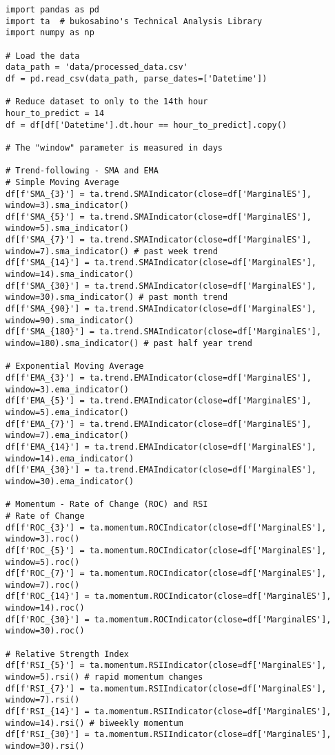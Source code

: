 \documentclass[12pt]{report} %
\begin{document}
\begin{lstlisting}
import pandas as pd
import ta  # bukosabino's Technical Analysis Library
import numpy as np

# Load the data
data_path = 'data/processed_data.csv'
df = pd.read_csv(data_path, parse_dates=['Datetime'])

# Reduce dataset to only to the 14th hour
hour_to_predict = 14
df = df[df['Datetime'].dt.hour == hour_to_predict].copy()

# The "window" parameter is measured in days

# Trend-following - SMA and EMA
# Simple Moving Average
df[f'SMA_{3}'] = ta.trend.SMAIndicator(close=df['MarginalES'], window=3).sma_indicator()
df[f'SMA_{5}'] = ta.trend.SMAIndicator(close=df['MarginalES'], window=5).sma_indicator()
df[f'SMA_{7}'] = ta.trend.SMAIndicator(close=df['MarginalES'], window=7).sma_indicator() # past week trend
df[f'SMA_{14}'] = ta.trend.SMAIndicator(close=df['MarginalES'], window=14).sma_indicator()
df[f'SMA_{30}'] = ta.trend.SMAIndicator(close=df['MarginalES'], window=30).sma_indicator() # past month trend
df[f'SMA_{90}'] = ta.trend.SMAIndicator(close=df['MarginalES'], window=90).sma_indicator()
df[f'SMA_{180}'] = ta.trend.SMAIndicator(close=df['MarginalES'], window=180).sma_indicator() # past half year trend

# Exponential Moving Average
df[f'EMA_{3}'] = ta.trend.EMAIndicator(close=df['MarginalES'], window=3).ema_indicator()
df[f'EMA_{5}'] = ta.trend.EMAIndicator(close=df['MarginalES'], window=5).ema_indicator()
df[f'EMA_{7}'] = ta.trend.EMAIndicator(close=df['MarginalES'], window=7).ema_indicator()
df[f'EMA_{14}'] = ta.trend.EMAIndicator(close=df['MarginalES'], window=14).ema_indicator()
df[f'EMA_{30}'] = ta.trend.EMAIndicator(close=df['MarginalES'], window=30).ema_indicator()

# Momentum - Rate of Change (ROC) and RSI
# Rate of Change
df[f'ROC_{3}'] = ta.momentum.ROCIndicator(close=df['MarginalES'], window=3).roc()
df[f'ROC_{5}'] = ta.momentum.ROCIndicator(close=df['MarginalES'], window=5).roc()
df[f'ROC_{7}'] = ta.momentum.ROCIndicator(close=df['MarginalES'], window=7).roc()
df[f'ROC_{14}'] = ta.momentum.ROCIndicator(close=df['MarginalES'], window=14).roc()
df[f'ROC_{30}'] = ta.momentum.ROCIndicator(close=df['MarginalES'], window=30).roc()

# Relative Strength Index
df[f'RSI_{5}'] = ta.momentum.RSIIndicator(close=df['MarginalES'], window=5).rsi() # rapid momentum changes
df[f'RSI_{7}'] = ta.momentum.RSIIndicator(close=df['MarginalES'], window=7).rsi()
df[f'RSI_{14}'] = ta.momentum.RSIIndicator(close=df['MarginalES'], window=14).rsi() # biweekly momentum
df[f'RSI_{30}'] = ta.momentum.RSIIndicator(close=df['MarginalES'], window=30).rsi()


\end{lstlisting}
\end{document}
